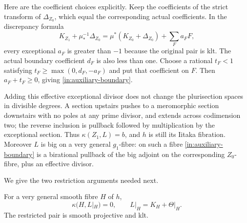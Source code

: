 Here are the coefficient choices explicitly.  Keep the coefficients
of the strict transform of $\Delta_{Z_0}$, which equal the
corresponding actual coefficients. In the discrepancy formula
\[
 K_{Z_1}+\mu^{-1}_*\Delta_{Z_0}
 =\mu^*(K_{Z_0}+\Delta_{Z_0})+\sum_F a_F F,
\]
every exceptional $a_F$ is greater than $-1$ because the original
pair is klt.  The actual boundary coefficient $d_F$ is also less
than one.  Choose a rational $t_F<1$ satisfying
$t_F\ge\max(0,d_F,-a_F)$ and put that coefficient on $F$.
Then $a_F+t_F\ge0$, giving \eqref{in:auxiliary-boundary}.

Adding this effective exceptional divisor does not change the
plurisection spaces in divisible degrees.  A section upstairs pushes
to a meromorphic section downstairs with no poles at any prime
divisor, and extends across codimension two; the reverse inclusion is
pullback followed by multiplication by the exceptional section.
Thus $\kappa(Z_1,L)=b$, and $h$ is still its Iitaka fibration.
Moreover $L$ is big on a very general $g_1$-fibre: on such a fibre
\eqref{in:auxiliary-boundary} is a birational pullback of the big
adjoint on the corresponding $Z_0$-fibre, plus an effective divisor.

We give the two restriction arguments needed next.

\begin{lemma}\label{in:iitaka-fibre}
For a very general smooth fibre $H$ of $h$,
\[
 \kappa(H,L|_H)=0,
 \qquad L|_H=K_H+\Theta|_H.
\]
The restricted pair is smooth projective and klt.
\end{lemma}


